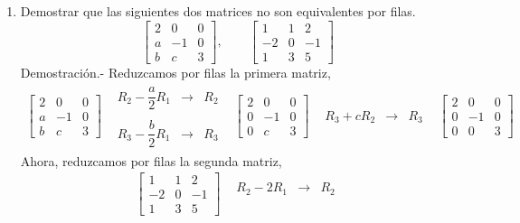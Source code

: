 \begin{enumerate}[\bfseries 1.]
    \item Demostrar que las siguientes dos matrices no son equivalentes por filas.
    $$
    \left[\begin{array}{*{3}{r}}
	    2&0&0\\
	    a&-1&0\\
	    b&c&3
    \end{array}\right] ,
    \qquad
    \left[\begin{array}{*{3}{r}}
	    1&1&2\\
	    -2&0&-1\\
	    1&3&5
    \end{array}\right]
    $$
    \vspace{0.5cm}
	Demostración.-\; Reduzcamos por filas la primera matriz,
	$$
	\begin{array}{*{5}{c}}
	    \left[\begin{array}{*{3}{r}}
		2&0&0\\
		a&-1&0\\
		b&c&3
	    \end{array}\right]
	    &
	    \begin{array}{rcl}
		R_2-\dfrac{a}{2}R_1&\to& R_2\\\\
		R_3-\dfrac{b}{2}R_1&\to& R_3
	    \end{array}
	    &
	    \left[\begin{array}{*{3}{r}}
		2&0&0\\
		0&-1&0\\
		0&c&3
	    \end{array}\right]
	    &
	    \begin{array}{rcl}
		R_3+cR_2&\to& R_3
	    \end{array}
	    &
	    \left[\begin{array}{*{3}{r}}
		2&0&0\\
		0&-1&0\\
		0&0&3
	    \end{array}\right]
	\end{array}
	$$
	Ahora, reduzcamos por filas la segunda matriz,
	$$
	\begin{array}{*{5}{c}}
	    \left[\begin{array}{*{3}{r}}
		1&1&2\\
		-2&0&-1\\
		1&3&5
	    \end{array}\right]
	    &
	    \begin{array}{rcl}
		R_2-2R_1&\to& R_2\\\\

\end{array}
\end{array}$$
\end{enumerate}
